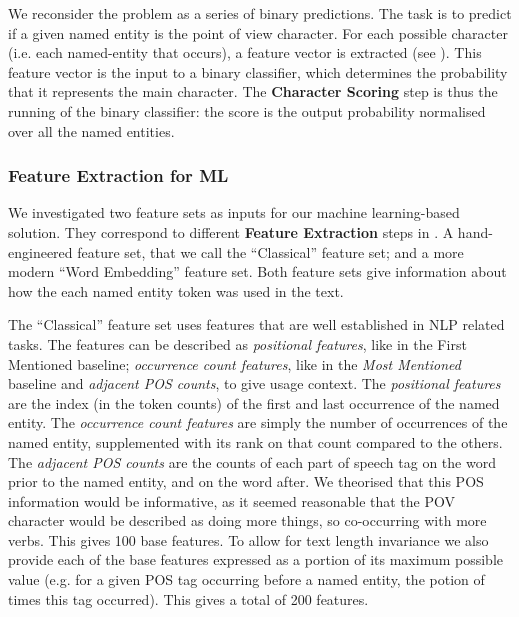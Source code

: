 \documentclass[11pt,a4paper]{article}
\begin{document}
We reconsider the problem as a series of binary predictions.
The task is to predict if a given named entity is the point of view character.
For each possible character (i.e. each named-entity that occurs), a feature vector is extracted (see ).
This feature vector is the input to a binary classifier, which determines the probability that it represents the main character.
The \textbf{Character Scoring} step is thus the running of the binary classifier:
the score is the output probability normalised over all the named entities.





\subsubsection{Feature Extraction for ML}\label{sec:feature-extraction-for-ml}
We investigated two feature sets as inputs for our machine learning-based solution.
They correspond to different \textbf{Feature Extraction} steps in .
A hand-engineered feature set, that we call the ``Classical'' feature set;
and a more modern ``Word Embedding'' feature set.
Both feature sets give information about how the each named entity token was used in the text.


The  ``Classical'' feature set uses features that are well established in NLP related tasks.
The features can be described as \emph{positional features}, like in the First Mentioned baseline; \emph{occurrence count features}, like in the \emph{Most Mentioned} baseline
and \emph{adjacent POS counts}, to give usage context.
The \emph{positional features} are the index (in the token counts) of the first and last occurrence of the named entity.
The \emph{occurrence count features} are simply the number of occurrences of the named entity, supplemented with its rank on that count compared to the others.
The \emph{adjacent POS counts} are the counts of each part of speech tag on the word prior to the named entity, and on the word after.
We theorised that this POS information would be informative, as it seemed reasonable that the POV character would be described as doing more things, so co-occurring with more verbs.
This gives 100 base features.
To allow for text length invariance we also provide each of the base features expressed as a portion of its maximum possible value (e.g. for a given POS tag occurring before a named entity, the potion of times this tag occurred).
This gives a total of 200 features.
\end{document}
